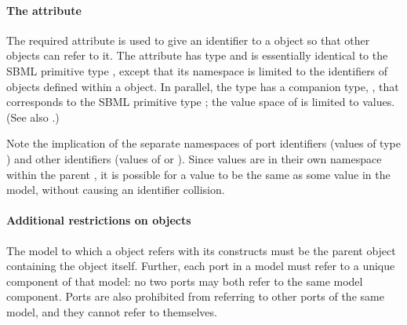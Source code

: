 \paragraph{The \hspace*{1pt} attribute}

The required attribute  is used to give an identifier to a
\Port object so that other objects can refer to it.  The attribute has
type  and is essentially identical to the SBML
primitive type , except that its namespace is limited to
the identifiers of \Port objects defined within a \Model object.  In
parallel, the  type has a companion type,
, that corresponds to the SBML primitive type
; the value space of  is limited
to  values.  (See also .)

Note the implication of the separate namespaces of port identifiers
(values of type ) and other identifiers (values of
 or ).  Since  values
are in their own namespace within the parent \Model, it is possible for
a  value to be the same as some  value
in the model, without causing an identifier collision. 


\paragraph{Additional restrictions on  objects}

The model to which a \Port object refers with its \SBaseRef constructs
must be the parent \Model object containing the \Port object itself.
Further, each port in a model must refer to a unique component of that
model: no two ports may both refer to the same model component.  Ports
are also prohibited from referring to other ports of the same model, and
they cannot refer to themselves.



